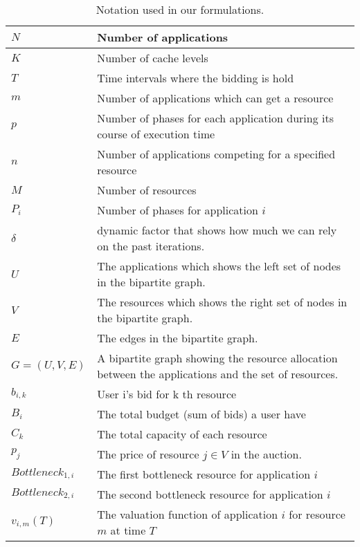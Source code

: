 \begin{table}[!tb] 
\centering
\caption{Notation used in our formulations.}\label{Table:notation}
\begin{tabular}{|p{0.7in}||p{2.3in}|} 
\hline $N$ & Number of applications \\
\hline $K$ & Number of cache levels \\
\hline $T$ & Time intervals where the bidding is hold \\
\hline $m$ & Number of applications which can get a resource \\ 
\hline $p$ & Number of phases for each application during its course of execution time \\ 
\hline $n$ & Number of applications competing for a specified resource \\
\hline $M$ & Number of resources \\
\hline $P_i$ & Number of phases for application $i$ \\
\hline $\delta$ & dynamic factor that shows how much we can rely on the past iterations. \\
\hline $U$ & The applications which shows the left set of nodes in the bipartite graph. \\
\hline $V$ & The resources which shows the right set of nodes in the bipartite graph. \\
\hline $E$ & The edges in the bipartite graph. \\
\hline $G=(U,V,E)$ & A bipartite graph showing the resource allocation between the applications and the set of resources. \\
\hline $b_{i,k}$ & User i's bid for k th resource \\
\hline $B_i$ & The total budget (sum of bids) a user have \\
\hline $C_k$ & The total capacity of each resource \\
\hline $p_{j}$ & The price of resource $j \in V$ in the auction. \\
\hline $Bottleneck_{1,i}$ & The first bottleneck resource for application $i$ \\
\hline $Bottleneck_{2,i}$ & The second bottleneck resource for application $i$ \\
\hline $v_{i,m}(T)$ & The valuation function of application $i$ for resource $m$ at time $T$ \\
\hline
\end{tabular}
\end{table}

